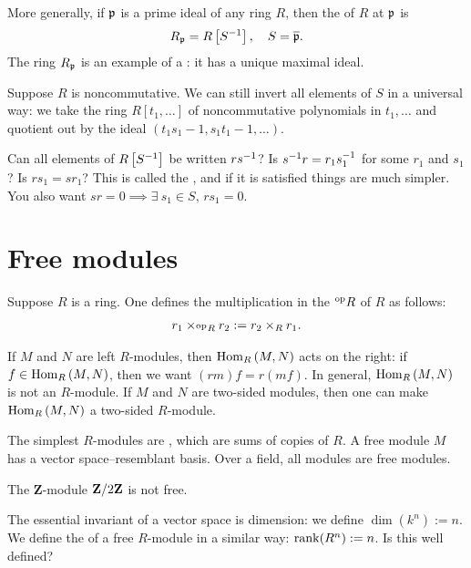 \documentclass[11pt, oneside,margin=1in]{article}
\begin{document}
More generally, if $\mathfrak p$ is a prime ideal of any ring $R$, then the  of $R$ at $\mathfrak p$ is
$$
R_{\mathfrak p} = R\left[ S^{-1}\right], \quad S = \overline {\mathfrak p}.
$$
The ring $R_{\mathfrak p} $ is an example of a : it has a unique maximal ideal.

Suppose $R$ is noncommutative. We can still invert all elements of $S$ in a universal way: we take the ring $R[t_1,\hdots]$ of noncommutative polynomials in $t_1,\hdots$ and quotient out by the ideal $(t_1s_1 - 1, s_1t_1 -1,\hdots)$. 

Can all elements of $R\left[S^{-1}\right]$ be written $rs^{-1}$? Is $s^{-1} r = r_1s_1^{-1}$ for some $r_1$ and $s_1$? Is $rs_1 =sr_1$? This is called the , and if it is satisfied things are much simpler. You also want $sr=0\implies \exists\: s_1 \in S,\, rs_1=0$.

\section{Free modules}
Suppose $R$ is a ring. One defines the multiplication in the  $\textsuperscript{op} R$ of $R$ as follows:
\begin{align*}
	r_1 \times_{\textsuperscript{op} R} r_2 := r_2 \times_R r_1.
\end{align*}

If $M$ and $N$ are left $R$-modules, then $\operatorname{Hom}_R\left( M,N \right) $ acts on the right: if $f\in\operatorname{Hom}_R\left( M,N \right)$, then we want $\left( rm \right) f=r\left( mf \right) $. In general, $\operatorname{Hom}_R\left( M,N \right) $ is not an $R$-module. If $M$ and $N$ are two-sided modules, then one can make $\operatorname{Hom}_R\left( M,N \right) $ a two-sided $R$-module. 

The simplest $R$-modules are , which are sums of copies of $R$. A free module $M$ has a vector space--resemblant basis. Over a field, all modules are free modules. 
\begin{example}\label{}
The $\mathbf{Z}$-module $\mathbf Z / 2\mathbf Z$ is not free.
\end{example}

The essential invariant of a vector space is dimension: we define $\dim(k^n):= n$. We define the  of a free $R$-module in a similar way: $\operatorname{rank} (R^n):= n$. Is this well defined?
\end{document}
